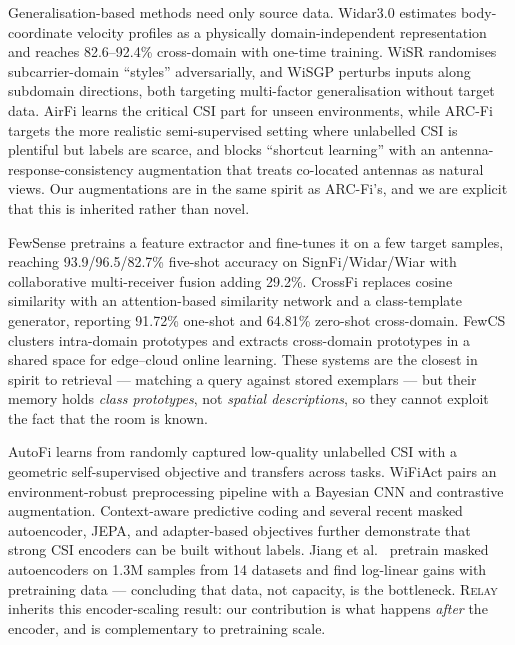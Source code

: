 \documentclass[conference]{IEEEtran}
\newcommand{\method}{\textsc{Relay}}
\begin{document}
Generalisation-based methods need only source data. Widar3.0 \cite{Zheng2019Widar3}
estimates body-coordinate velocity profiles as a physically domain-independent
representation and reaches 82.6--92.4\% cross-domain with one-time training. WiSR
\cite{Liu2024WiSR} randomises subcarrier-domain ``styles'' adversarially, and WiSGP
\cite{Liu2024WiSGP} perturbs inputs along subdomain directions, both targeting
multi-factor generalisation without target data. AirFi \cite{Wang2022AirFi} learns the
critical CSI part for unseen environments, while ARC-Fi \cite{Xu2023ARCFi} targets the
more realistic semi-supervised setting where unlabelled CSI is plentiful but labels are
scarce, and blocks ``shortcut learning'' with an antenna-response-consistency augmentation
that treats co-located antennas as natural views. Our augmentations are in the same spirit
as ARC-Fi's, and we are explicit that this is inherited rather than novel.

FewSense \cite{Yin2022FewSense} pretrains a feature extractor and fine-tunes it on a few
target samples, reaching 93.9/96.5/82.7\% five-shot accuracy on SignFi/Widar/Wiar with
collaborative multi-receiver fusion adding 29.2\%. CrossFi \cite{Zhao2024CrossFi} replaces
cosine similarity with an attention-based similarity network and a class-template
generator, reporting 91.72\% one-shot and 64.81\% zero-shot cross-domain. FewCS
\cite{Yang2023FewCS} clusters intra-domain prototypes and extracts cross-domain prototypes
in a shared space for edge--cloud online learning. These systems are the closest in spirit
to retrieval --- matching a query against stored exemplars --- but their memory holds
\emph{class prototypes}, not \emph{spatial descriptions}, so they cannot exploit the fact
that the room is known.

AutoFi \cite{Yang2022AutoFi} learns from randomly captured low-quality unlabelled CSI with
a geometric self-supervised objective and transfers across tasks. WiFiAct
\cite{Lyons2024WiFiAct} pairs an environment-robust preprocessing pipeline with a Bayesian
CNN and contrastive augmentation. Context-aware predictive coding \cite{Barahimi2024CPC}
and several recent masked autoencoder, JEPA, and adapter-based objectives further
demonstrate that strong CSI encoders can be built without labels. Jiang et al.\
\cite{Jiang2025Foundation} pretrain masked autoencoders on 1.3M samples from 14 datasets
and find log-linear gains with pretraining data --- concluding that data, not capacity, is
the bottleneck. \method{} inherits this encoder-scaling result: our contribution is what
happens \emph{after} the encoder, and is complementary to pretraining scale.
\end{document}
